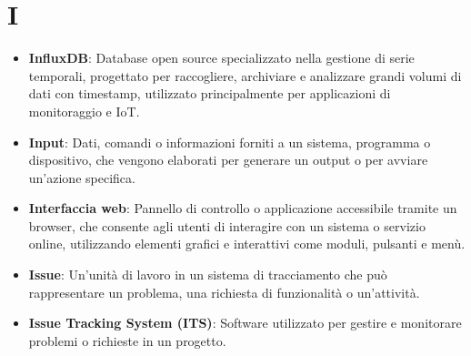 \section{I}
\begin{itemize}
    \item \textbf{InfluxDB}: Database open source specializzato nella gestione di serie temporali, progettato per raccogliere, archiviare e analizzare grandi volumi di dati con timestamp, utilizzato principalmente per applicazioni di monitoraggio e IoT.
    \item \textbf{Input}: Dati, comandi o informazioni forniti a un sistema, programma o dispositivo, che vengono elaborati per generare un output o per avviare un'azione specifica.
    \item \textbf{Interfaccia web}: Pannello di controllo o applicazione accessibile tramite un browser, che consente agli utenti di interagire con un sistema o servizio online, utilizzando elementi grafici e interattivi come moduli, pulsanti e menù.
    \item \textbf{Issue}: Un'unità di lavoro in un sistema di tracciamento che può rappresentare un problema, una richiesta di funzionalità o un'attività.
    \item \textbf{Issue Tracking System (ITS)}: Software utilizzato per gestire e monitorare problemi o richieste in un progetto.
\end{itemize}

